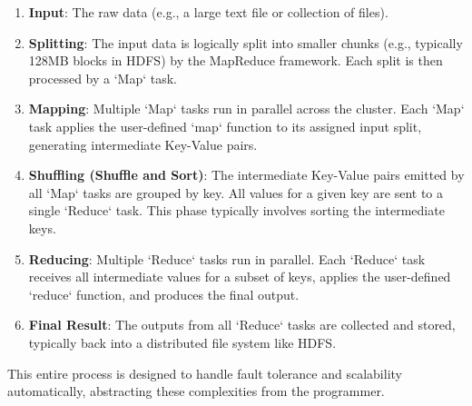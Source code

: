 \documentclass{article}
\begin{document}
\begin{enumerate}
    \item \textbf{Input}: The raw data (e.g., a large text file or collection of files).
    \item \textbf{Splitting}: The input data is logically split into smaller chunks (e.g., typically 128MB blocks in HDFS) by the MapReduce framework. Each split is then processed by a `Map` task.
    \item \textbf{Mapping}: Multiple `Map` tasks run in parallel across the cluster. Each `Map` task applies the user-defined `map` function to its assigned input split, generating intermediate Key-Value pairs.
    \item \textbf{Shuffling (Shuffle and Sort)}: The intermediate Key-Value pairs emitted by all `Map` tasks are grouped by key. All values for a given key are sent to a single `Reduce` task. This phase typically involves sorting the intermediate keys.
    \item \textbf{Reducing}: Multiple `Reduce` tasks run in parallel. Each `Reduce` task receives all intermediate values for a subset of keys, applies the user-defined `reduce` function, and produces the final output.
    \item \textbf{Final Result}: The outputs from all `Reduce` tasks are collected and stored, typically back into a distributed file system like HDFS.
\end{enumerate}
This entire process is designed to handle fault tolerance and scalability automatically, abstracting these complexities from the programmer.
\end{document}
